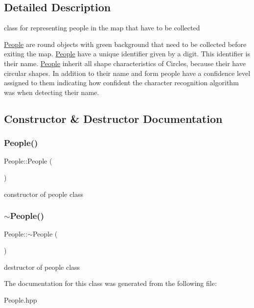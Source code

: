 \subsection{Detailed Description}
class for representing people in the map that have to be collected 

\mbox{\hyperlink{class_people}{People}} are round objects with green background that need to be collected before exiting the map. \mbox{\hyperlink{class_people}{People}} have a unique identifier given by a digit. This identifier is their name. \mbox{\hyperlink{class_people}{People}} inherit all shape characteristics of Circles, because their have circular shapes. In addition to their name and form people have a confidence level assigned to them indicating how confident the character recognition algorithm was when detecting their name. 

\subsection{Constructor \& Destructor Documentation}
\mbox{\label{class_people_aae1408eddfd15a5007003ecdf1507941}} 
\subsubsection{\texorpdfstring{People()}{People()}}
{\footnotesize\ttfamily People\+::\+People (\begin{DoxyParamCaption}{ }\end{DoxyParamCaption})}

constructor of people class \mbox{\label{class_people_adae124857f64dadff4e1801410b3dab2}} 
\subsubsection{\texorpdfstring{$\sim$\+People()}{~People()}}
{\footnotesize\ttfamily People\+::$\sim$\+People (\begin{DoxyParamCaption}{ }\end{DoxyParamCaption})}

destructor of people class 

The documentation for this class was generated from the following file\+:\begin{DoxyCompactItemize}
\item 
People.\+hpp\end{DoxyCompactItemize}
